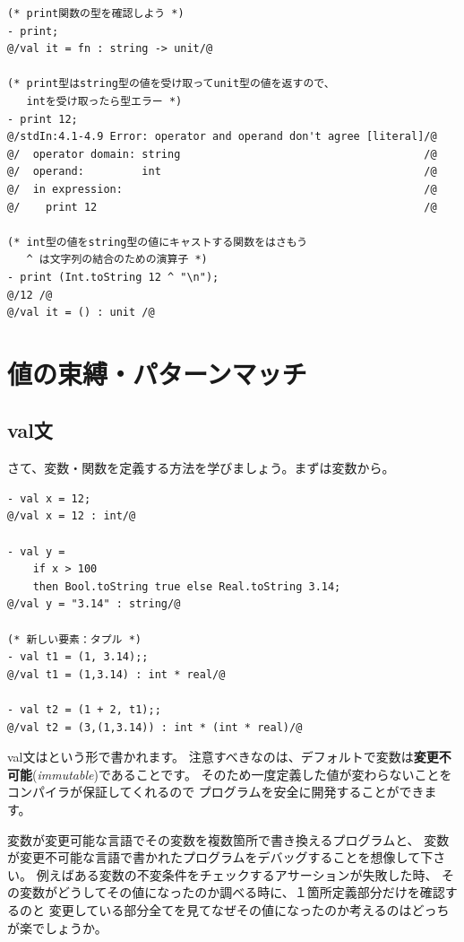 \documentclass[11pt,a4paper]{article}
\begin{document}
\begin{lstlisting}[caption=型エラー２,label=code:type-error2]
(* print関数の型を確認しよう *)
- print;
@/val it = fn : string -> unit/@

(* print型はstring型の値を受け取ってunit型の値を返すので、
   intを受け取ったら型エラー *)
- print 12;
@/stdIn:4.1-4.9 Error: operator and operand don't agree [literal]/@
@/  operator domain: string                                      /@
@/  operand:         int                                         /@
@/  in expression:                                               /@
@/    print 12                                                   /@

(* int型の値をstring型の値にキャストする関数をはさもう
   ^ は文字列の結合のための演算子 *)
- print (Int.toString 12 ^ "\n");
@/12 /@
@/val it = () : unit /@
\end{lstlisting}


\section{値の束縛・パターンマッチ}
\subsection{val文}
さて、変数・関数を定義する方法を学びましょう。まずは変数から。
\begin{lstlisting}[caption={val文}, label={code:first-definition}]
- val x = 12;
@/val x = 12 : int/@

- val y =
    if x > 100
    then Bool.toString true else Real.toString 3.14;
@/val y = "3.14" : string/@

(* 新しい要素：タプル *)
- val t1 = (1, 3.14);;
@/val t1 = (1,3.14) : int * real/@

- val t2 = (1 + 2, t1);;
@/val t2 = (3,(1,3.14)) : int * (int * real)/@
\end{lstlisting}

val文はという形で書かれます。
注意すべきなのは、デフォルトで変数は{\bfseries 変更不可能}({\itshape immutable})であることです。
そのため一度定義した値が変わらないことをコンパイラが保証してくれるので
プログラムを安全に開発することができます。

変数が変更可能な言語でその変数を複数箇所で書き換えるプログラムと、
変数が変更不可能な言語で書かれたプログラムをデバッグすることを想像して下さい。
例えばある変数の不変条件をチェックするアサーションが失敗した時、
その変数がどうしてその値になったのか調べる時に、１箇所定義部分だけを確認するのと
変更している部分全てを見てなぜその値になったのか考えるのはどっちが楽でしょうか。
\end{document}
